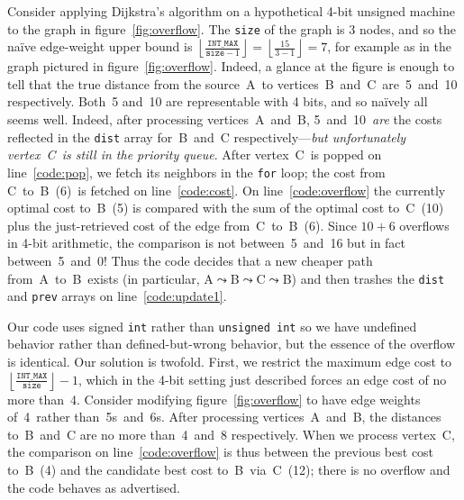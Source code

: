 Consider applying Dijkstra's algorithm on a hypothetical 4-bit unsigned machine to
the graph in figure~\ref{fig:overflow}.  The \texttt{size} of the graph is 3 nodes, and so the na\"ive edge-weight upper bound is $\left\lfloor\frac{\texttt{INT\_MAX}}{\texttt{size}-1}\right\rfloor = \left\lfloor\frac{15}{3-1}\right\rfloor = 7$, for example as in the graph pictured in figure~\ref{fig:overflow}.  Indeed, a glance at the figure is enough to tell that the true distance from the source~A~to vertices~B~and~C~are~5~and~10 respectively. Both~5 and~10 are representable with 4 bits, and so na\"ively all seems well.  %
Indeed, after processing vertices~A~and~B, 5~and~10~\emph{are} the costs reflected in the \texttt{dist} array for~B~and~C respectively---\emph{but unfortunately vertex~C~is still in the priority queue}.  After vertex~C~is popped on line~\ref{code:pop}, we fetch its neighbors in the \texttt{for} loop; the cost from C~to~B~(6)~is fetched on line~\ref{code:cost}.  On line~\ref{code:overflow} the currently optimal cost to~B~(5) is compared with the sum of the optimal cost to~C~(10) plus the just-retrieved cost of the edge from~C~to~B~(6).  Since $10+6$ overflows in 4-bit arithmetic, the comparison is not between~5~and~16 but in fact between~5~and~0!  Thus the code decides that a new cheaper path from~A~to~B~exists (in particular, A$\leadsto$B$\leadsto$C$\leadsto$B) and then trashes the \texttt{dist} and \texttt{prev} arrays on line~\ref{code:update1}.

Our code uses signed \texttt{int} rather than \texttt{unsigned int} so we have undefined behavior rather than defined-but-wrong behavior, but the essence of the overflow is identical.
Our solution is twofold.  First, we restrict the maximum edge cost to $\left\lfloor\frac{\texttt{INT\_MAX}}{\texttt{size}}\right\rfloor - 1$, which in the 4-bit setting just described forces an edge cost of no more than~4.  Consider modifying figure~\ref{fig:overflow} to
have edge weights of~4~rather than~5s~and~6s.  After processing vertices~A~and~B, the distances to~B~and~C are no more than~4~and~8 respectively.  When we process vertex~C, the comparison on line~\ref{code:overflow} is thus between the previous best cost to~B~(4) and the candidate best cost to~B~via~C~(12); there is no overflow and the code behaves as advertised.

